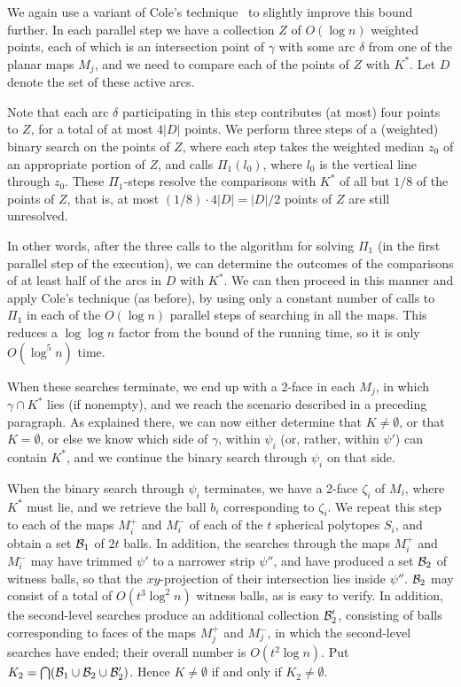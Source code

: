 \documentclass[a4paper,12pt]{article}
\def\B{{\cal B}}
\begin{document}
We again use a variant of Cole's technique~\cite{RC} to slightly
improve this bound further. In each parallel step we have a
collection $Z$ of $O(\log n)$ weighted points, each of which is an
intersection point of $\gamma$ with some arc $\delta$ from one of
the planar maps $M_j$, and we need to compare each of the points of
$Z$ with $K^*$. Let $D$ denote the set of these active arcs.

Note that each arc $\delta$ participating in this step
contributes (at most) four points to $Z$, for a total of at most
$4|D|$ points. We perform three steps of a (weighted) binary search on
the points of $Z$, where each step takes the weighted median $z_0$
of an appropriate portion of $Z$, and calls $\Pi_1(l_0)$, where $l_0$
is the vertical line through $z_0$. These $\Pi_1$-steps resolve the
comparisons with $K^*$ of all but $1/8$ of the points of $Z$, that is,
at most $(1/8)\cdot 4|D| = |D|/2$ points of $Z$ are still unresolved.

In other words, after the three calls
to the algorithm for solving $\Pi_1$ (in the first parallel
step of the execution), we can determine the outcomes of the
comparisons of at least half of the arcs in $D$ with $K^*$. We can
then proceed in this manner and apply Cole's technique (as before),
by using only a constant number of calls to $\Pi_1$ in each of the
$O(\log n)$ parallel steps of searching in all the maps.
This reduces a $\log \log n$ factor from the bound of the
running time, so it is only $O(\log^5n)$ time.

When these searches terminate, we end up with a 2-face in each
$M_j$, in which $\gamma \cap K^*$ lies (if nonempty), and we reach
the scenario described in a preceding paragraph. As explained there,
we can now either determine that $K \neq \emptyset$, or that $K =
\emptyset$, or else we know which side of $\gamma$, within $\psi_i$
(or, rather, within $\psi'$) can contain $K^*$, and we continue the
binary search through $\psi_i$ on that side.

When the binary search through $\psi_i$ terminates, we have a 2-face
$\zeta_i$ of $M_i$, where $K^*$ must lie, and we retrieve the ball
$b_i$ corresponding to $\zeta_i$. We repeat this step to each of the
maps $M_i^+$ and $M_i^-$ of each of the $t$ spherical polytopes
$S_i$, and obtain a set $\B_1$ of $2t$ balls. In addition, the
searches through the maps $M_i^+$ and $M_i^-$ may have trimmed
$\psi'$ to a narrower strip $\psi''$, and have produced a set $\B_2$
of witness balls, so that the $xy$-projection of their intersection
lies inside $\psi''$. $\B_2$ may consist of a total of $O(t^3 \log^2
n)$ witness balls, as is easy to verify. In addition, the
second-level searches produce an additional collection $\B_2'$,
consisting of balls corresponding to faces of the maps $M_j^+$ and
$M_j^-$, in which the second-level searches have ended; their
overall number is $O(t^2 \log n)$. Put $K_2 = \bigcap (\B_1 \cup
\B_2 \cup \B_2')$. Hence $K \neq \emptyset$ if and only if $K_2 \neq
\emptyset$.
\end{document}
